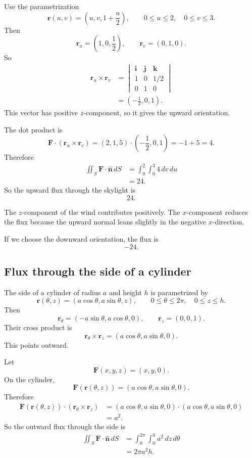 Use the parametrization
\[
    \mathbf r(u,v)=\left(u,v,1+\frac u2\right),
    \qquad
    0\le u\le2,\quad 0\le v\le3.
\]
Then
\[
    \mathbf r_u=\left(1,0,\frac12\right),
    \qquad
    \mathbf r_v=(0,1,0).
\]
So
\[
\begin{aligned}
    \mathbf r_u\times\mathbf r_v
    &=
    \begin{vmatrix}
    \mathbf i&\mathbf j&\mathbf k\\
    1&0&1/2\\
    0&1&0
    \end{vmatrix}                                      \\[1mm]
    &=
    \left(-\frac12,0,1\right).
\end{aligned}
\]
This vector has positive \(z\)-component, so it gives the upward orientation.

The dot product is
\[
    \mathbf F\cdot(\mathbf r_u\times\mathbf r_v)
    =
    (2,1,5)\cdot\left(-\frac12,0,1\right)
    =
    -1+5
    =
    4.
\]
Therefore
\[
\begin{aligned}
    \iint_S \mathbf F\cdot\widehat{\mathbf n}\,dS
    &=
    \int_0^2\int_0^3 4\,dv\,du\\
    &=
    24.
\end{aligned}
\]
So the upward flux through the skylight is
\[
\boxed{
    24.
}
\]

The \(z\)-component of the wind contributes positively.  The \(x\)-component reduces
the flux because the upward normal leans slightly in the negative \(x\)-direction.

If we choose the downward orientation, the flux is
\[
    -24.
\]

\subsection{Flux through the side of a cylinder}

The side of a cylinder of radius \(a\) and height \(h\) is parametrized by
\[
    \mathbf r(\theta,z)=(a\cos\theta,a\sin\theta,z),
    \qquad
    0\le\theta\le2\pi,\quad 0\le z\le h.
\]
Then
\[
    \mathbf r_\theta=(-a\sin\theta,a\cos\theta,0),
    \qquad
    \mathbf r_z=(0,0,1).
\]
Their cross product is
\[
    \mathbf r_\theta\times\mathbf r_z
    =
    (a\cos\theta,a\sin\theta,0).
\]
This points outward.

Let
\[
    \mathbf F(x,y,z)=(x,y,0).
\]
On the cylinder,
\[
    \mathbf F(\mathbf r(\theta,z))=(a\cos\theta,a\sin\theta,0).
\]
Therefore
\[
\begin{aligned}
    \mathbf F(\mathbf r(\theta,z))\cdot
    (\mathbf r_\theta\times\mathbf r_z)
    &=
    (a\cos\theta,a\sin\theta,0)\cdot
    (a\cos\theta,a\sin\theta,0)\\
    &=
    a^2.
\end{aligned}
\]
So the outward flux through the side is
\[
\begin{aligned}
    \iint_S \mathbf F\cdot\widehat{\mathbf n}\,dS
    &=
    \int_0^{2\pi}\int_0^h a^2\,dz\,d\theta\\
    &=
    2\pi a^2h.
\end{aligned}
\]


